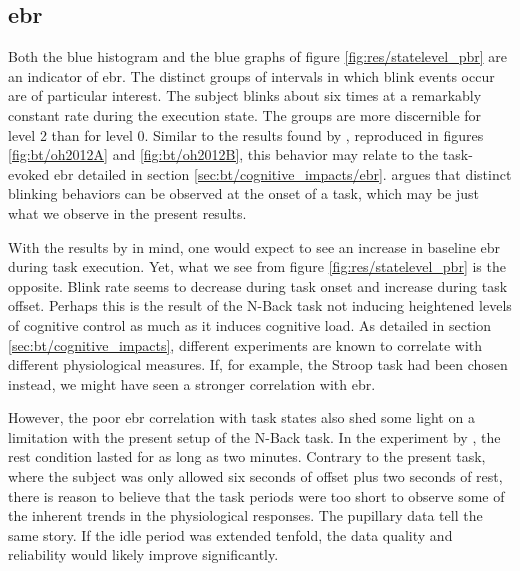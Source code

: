 % 

\subsection{\acrlong{ebr}} \label{sec:disc/ocular_correlations/ebr}

Both the blue histogram and the blue graphs of figure \ref{fig:res/statelevel_pbr} are an indicator of \acrshort{ebr}. The distinct groups of intervals in which blink events occur are of particular interest. The subject blinks about six times at a remarkably constant rate during the execution state. The groups are more discernible for level 2 than for level 0. Similar to the results found by \textcite{oh2012}, reproduced in figures \ref{fig:bt/oh2012A} and \ref{fig:bt/oh2012B}, this behavior may relate to the task-evoked \acrshort{ebr} detailed in section \ref{sec:bt/cognitive_impacts/ebr}. \textcite{oh2012} argues that distinct blinking behaviors can be observed at the onset of a task, which may be just what we observe in the present results.

With the results by \textcite{oh2012} in mind, one would expect to see an increase in baseline \acrshort{ebr} during task execution. Yet, what we see from figure \ref{fig:res/statelevel_pbr} is the opposite. Blink rate seems to decrease during task onset and increase during task offset. Perhaps this is the result of the N-Back task not inducing heightened levels of cognitive control as much as it induces cognitive load. As detailed in section \ref{sec:bt/cognitive_impacts}, different experiments are known to correlate with different physiological measures. If, for example, the Stroop task had been chosen instead, we might have seen a stronger correlation with \acrshort{ebr}.

However, the poor \acrshort{ebr} correlation with task states also shed some light on a limitation with the present setup of the N-Back task. In the experiment by \textcite{oh2012}, the rest condition lasted for as long as two minutes. Contrary to the present task, where the subject was only allowed six seconds of offset plus two seconds of rest, there is reason to believe that the task periods were too short to observe some of the inherent trends in the physiological responses. The pupillary data tell the same story. If the idle period was extended tenfold, the data quality and reliability would likely improve significantly.

